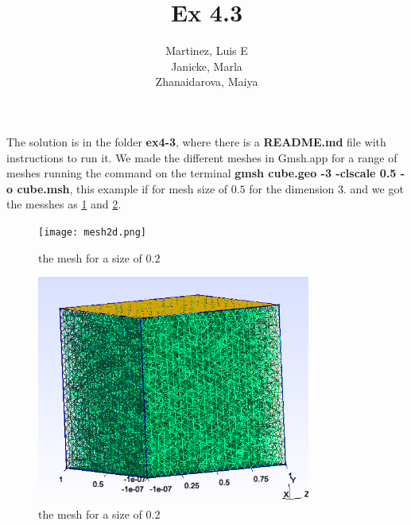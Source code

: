 \documentclass{article}
\author{Martinez, Luis E\\
		Janicke, Marla\\
		Zhanaidarova, Maiya}
\title{Ex 4.3}
\begin{document}
\maketitle
The solution is in the folder \textbf{ex4-3}, where there is  a \textbf{README.md} file with instructions to run it. We made the different meshes in Gmsh.app for a range of meshes running the command on the terminal \textbf{gmsh cube.geo -3  -clscale 0.5  -o cube.msh}, this example if for mesh size of $0.5$ for the dimension $3$. and we got the messhes as \ref{fig:2dmesh} and \ref{fig:3dmesh}.
\begin{figure}
	\centering
	\texttt{[image: mesh2d.png]}
	\caption{the mesh for a size of $0.2$}
	\label{fig:2dmesh}
\end{figure}
\begin{figure}
	\centering
	\includegraphics[width =9cm]{mesh3d.png}
	\caption{the mesh for a size of $0.2$}
	\label{fig:3dmesh}
\end{figure}
\end{document}
